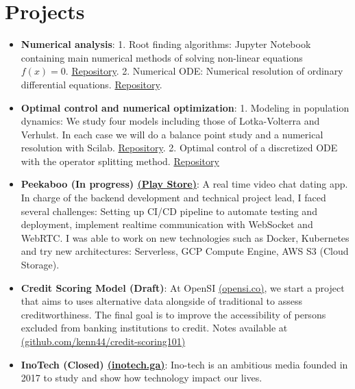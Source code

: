 \documentclass[letterpaper,11pt]{article}
\newcommand{\resumeItem}[2]{
  \item\small{
    \textbf{#1}{: #2 \vspace{-2pt}}
  }
}
\newcommand{\resumeSubItem}[2]{\resumeItem{#1}{#2}\vspace{-4pt}}
\newcommand{\resumeSubHeadingListStart}{\begin{itemize}[leftmargin=*]}
\newcommand{\resumeSubHeadingListEnd}{\end{itemize}}
\begin{document}
\section{Projects}
  \resumeSubHeadingListStart
      \resumeSubItem{Numerical analysis}
      {1. Root finding algorithms: Jupyter Notebook containing main numerical methods of solving non-linear equations $f(x)=0$. \href{https://github.com/kenn44/root-finding-algorithms}{Repository}. 2. Numerical ODE: Numerical resolution of ordinary differential equations. \href{https://github.com/kenn44/numerical-ordinary-differential-equations}{Repository}.}
      \resumeSubItem{Optimal control and numerical optimization}
      {1. Modeling in population dynamics: We study four models including those of Lotka-Volterra and Verhulst. In each case we will do a balance point study and a numerical resolution with Scilab. \href{https://github.com/kenn44/modeling-in-population-dynamics}{Repository}. 2. Optimal control of a discretized ODE with the operator splitting method. \href{https://github.com/kenn44/optimal-control-ode-splitting}{Repository}}
    \resumeSubItem{Peekaboo (In progress) \href{https://play.google.com/store/apps/details?id=mvp.peekaboo.dev}{(Play Store)}}
      {A real time video chat dating app. In charge of the backend development and technical project lead, I faced several challenges: Setting up CI/CD pipeline to automate testing and deployment, implement realtime communication with WebSocket and WebRTC. I was able to work on new technologies such as Docker, Kubernetes and try new architectures: Serverless, GCP Compute Engine, AWS S3 (Cloud Storage).}
    \resumeSubItem{Credit Scoring Model (Draft)}
      {At OpenSI \href{http://opensi.co/}{(opensi.co)}, we start a project that aims to uses alternative data alongside of traditional to assess creditworthiness. The final goal is to improve the accessibility of persons excluded from banking institutions to credit. Notes available at \href{https://github.com/kenn44/credit-scoring101}{(github.com/kenn44/credit-scoring101)} }
    \resumeSubItem{InoTech (Closed) \href{https://inotech.ga/}{(inotech.ga)}}
      {Ino-tech is an ambitious media founded in 2017 to study and show how technology impact our lives.}
  \resumeSubHeadingListEnd

%


\end{document}
